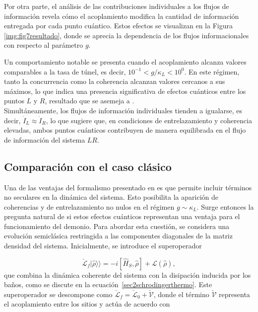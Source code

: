 Por otra parte, el análisis de las contribuciones individuales a los flujos de información revela cómo el acoplamiento modifica la cantidad de información entregada por cada punto cuántico. Estos efectos se visualizan en la Figura \ref{img:fig7resultado}, donde se aprecia la dependencia de los flujos informacionales con respecto al parámetro \( g \).


Un comportamiento notable se presenta cuando el acoplamiento alcanza valores comparables a la tasa de túnel, es decir, \( 10^{-1}< g/\kappa_{L}< 10^{0} \). En este régimen, tanto la concurrencia como la coherencia alcanzan valores cercanos a sus máximos, lo que indica una presencia significativa de efectos cuánticos entre los puntos \( L \) y \( R \), resultado que se asemeja a \cite{prech2023entanglement}. 
\\

Simultáneamente, los flujos de información individuales tienden a igualarse, es decir, \( \dot{I}_{L} \approx \dot{I}_{R} \), lo que sugiere que, en condiciones de entrelazamiento y coherencia elevadas, ambos puntos cuánticos contribuyen de manera equilibrada en el flujo de información del sistema $LR$. 

\label{sec5:demonio1}

\newpage 

\subsection{Comparación con el caso clásico}

Una de las ventajas del formalismo presentado en \cite{potts2021thermodynamically} es que permite incluir términos no seculares en la dinámica del sistema. Esto posibilita la aparición de coherencias y de entrelazamiento no nulos en el régimen \( g \sim \kappa_{L} \). Surge entonces la pregunta natural de si estos efectos cuánticos representan una ventaja para el funcionamiento del demonio. Para abordar esta cuestión, se considera una evolución semiclásica restringida a las componentes diagonales de la matriz densidad del sistema. Inicialmente, se introduce el superoperador

\begin{equation*}
\check{\mathcal{L}}_{f}|\hat{\rho}\rangle\rangle = -i[\hat{H}_{S}, \hat{\rho}] + \mathcal{L}(\hat{\rho}),
\end{equation*}
que combina la dinámica coherente del sistema con la disipación inducida por los baños, como se discute en la ecuación~\eqref{sec2schrodingerthermo}. Este superoperador se descompone como $\check{\mathcal{L}}_{f} = \check{\mathcal{L}}_{0} + \check{\mathcal{V}}$, donde el término $\check{\mathcal{V}}$ representa el acoplamiento entre los sitios y actúa de acuerdo con

